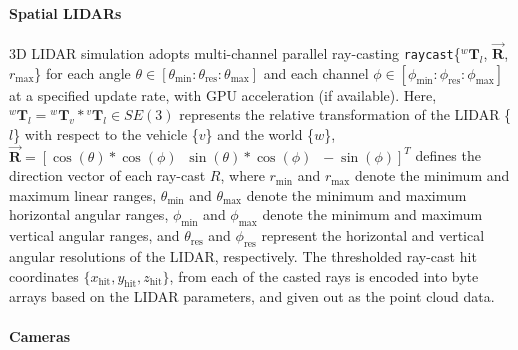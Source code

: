\paragraph{Spatial LIDARs}
\label{Spatial LIDARs}

3D LIDAR simulation adopts multi-channel parallel ray-casting \texttt{raycast}\{$^w\mathbf{T}_l$, $\vec{\mathbf{R}}$, $r_{\text{max}}$\} for each angle $\theta \in \left [ \theta_{\text{min}}:\theta_{\text{res}}:\theta_{\text{max}} \right ]$ and each channel $\phi \in \left [ \phi_{\text{min}}:\phi_{\text{res}}:\phi_{\text{max}} \right ]$ at a specified update rate, with GPU acceleration (if available). Here, ${^w\mathbf{T}_l} = {^w\mathbf{T}_v} * {^v\mathbf{T}_l} \in SE(3)$ represents the relative transformation of the LIDAR \{$l$\} with respect to the vehicle \{$v$\} and the world \{$w$\}, $\vec{\mathbf{R}} = \left [\cos(\theta)*\cos(\phi) \;\; \sin(\theta)*\cos(\phi) \;\; -\sin(\phi) \right ]^T$ defines the direction vector of each ray-cast $R$, where $r_{\text{min}}$ and $r_{\text{max}}$ denote the minimum and maximum linear ranges, $\theta_{\text{min}}$ and $\theta_{\text{max}}$ denote the minimum and maximum horizontal angular ranges, $\phi_{\text{min}}$ and $\phi_{\text{max}}$ denote the minimum and maximum vertical angular ranges, and $\theta_{\text{res}}$ and $\phi_{\text{res}}$ represent the horizontal and vertical angular resolutions of the LIDAR, respectively. The thresholded ray-cast hit coordinates $\{x_{\text{hit}}, y_{\text{hit}}, z_{\text{hit}}\}$, from each of the casted rays is encoded into byte arrays based on the LIDAR parameters, and given out as the point cloud data.

\paragraph{Cameras}
\label{Cameras}

